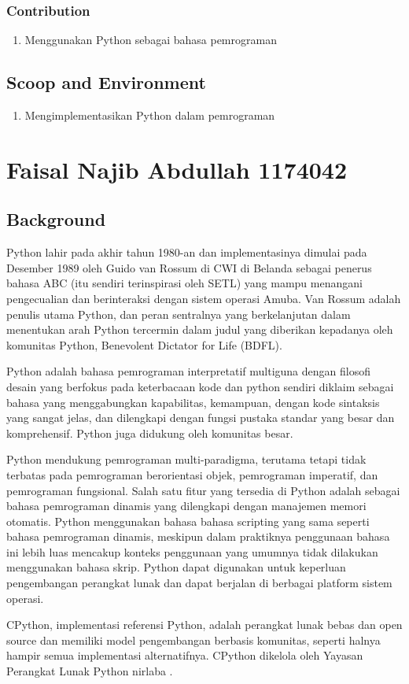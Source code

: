 \subsubsection{Contribution}
\begin{enumerate}
\item Menggunakan Python sebagai bahasa pemrograman
\end{enumerate}
\subsection{Scoop and Environment}
\begin{enumerate}
\item Mengimplementasikan Python dalam pemrograman
\end{enumerate}


\section{Faisal Najib Abdullah 1174042}
\subsection{Background}
\label{Background}
\par
Python lahir pada akhir tahun 1980-an dan implementasinya dimulai pada Desember 1989 oleh Guido van Rossum di CWI di Belanda sebagai penerus bahasa ABC (itu sendiri terinspirasi oleh SETL) yang mampu menangani pengecualian dan berinteraksi dengan sistem operasi Amuba. Van Rossum adalah penulis utama Python, dan peran sentralnya yang berkelanjutan dalam menentukan arah Python tercermin dalam judul yang diberikan kepadanya oleh komunitas Python, Benevolent Dictator for Life (BDFL).
\par
Python adalah bahasa pemrograman interpretatif multiguna dengan filosofi desain yang berfokus pada keterbacaan kode dan python sendiri diklaim sebagai bahasa yang menggabungkan kapabilitas, kemampuan, dengan kode sintaksis yang sangat jelas, dan dilengkapi dengan fungsi pustaka standar yang besar dan komprehensif. Python juga didukung oleh komunitas besar.
\par
Python mendukung pemrograman multi-paradigma, terutama tetapi tidak terbatas pada pemrograman berorientasi objek, pemrograman imperatif, dan pemrograman fungsional. Salah satu fitur yang tersedia di Python adalah sebagai bahasa pemrograman dinamis yang dilengkapi dengan manajemen memori otomatis. Python menggunakan bahasa bahasa scripting yang sama seperti bahasa pemrograman dinamis, meskipun dalam praktiknya penggunaan bahasa ini lebih luas mencakup konteks penggunaan yang umumnya tidak dilakukan menggunakan bahasa skrip. Python dapat digunakan untuk keperluan pengembangan perangkat lunak dan dapat berjalan di berbagai platform sistem operasi.
\par
CPython, implementasi referensi Python, adalah perangkat lunak bebas dan open source dan memiliki model pengembangan berbasis komunitas, seperti halnya hampir semua implementasi alternatifnya. CPython dikelola oleh Yayasan Perangkat Lunak Python nirlaba \cite{van2007python}.


